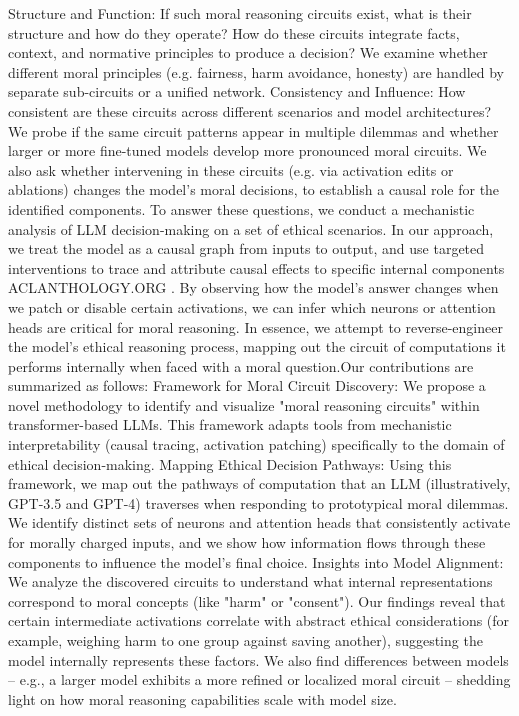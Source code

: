 Structure and Function: If such moral reasoning circuits exist, what is their structure and how do they operate? How do these circuits integrate facts, context, and normative principles to produce a decision? We examine whether different moral principles (e.g. fairness, harm avoidance, honesty) are handled by separate sub-circuits or a unified network.
Consistency and Influence: How consistent are these circuits across different scenarios and model architectures? We probe if the same circuit patterns appear in multiple dilemmas and whether larger or more fine-tuned models develop more pronounced moral circuits. We also ask whether intervening in these circuits (e.g. via activation edits or ablations) changes the model’s moral decisions, to establish a causal role for the identified components.
To answer these questions, we conduct a mechanistic analysis of LLM decision-making on a set of ethical scenarios. In our approach, we treat the model as a causal graph from inputs to output, and use targeted interventions to trace and attribute causal effects to specific internal components​
ACLANTHOLOGY.ORG
. By observing how the model’s answer changes when we patch or disable certain activations, we can infer which neurons or attention heads are critical for moral reasoning. In essence, we attempt to reverse-engineer the model’s ethical reasoning process, mapping out the circuit of computations it performs internally when faced with a moral question.Our contributions are summarized as follows:
Framework for Moral Circuit Discovery: We propose a novel methodology to identify and visualize "moral reasoning circuits" within transformer-based LLMs. This framework adapts tools from mechanistic interpretability (causal tracing, activation patching) specifically to the domain of ethical decision-making.
Mapping Ethical Decision Pathways: Using this framework, we map out the pathways of computation that an LLM (illustratively, GPT-3.5 and GPT-4) traverses when responding to prototypical moral dilemmas. We identify distinct sets of neurons and attention heads that consistently activate for morally charged inputs, and we show how information flows through these components to influence the model’s final choice.
Insights into Model Alignment: We analyze the discovered circuits to understand what internal representations correspond to moral concepts (like "harm" or "consent"). Our findings reveal that certain intermediate activations correlate with abstract ethical considerations (for example, weighing harm to one group against saving another), suggesting the model internally represents these factors. We also find differences between models – e.g., a larger model exhibits a more refined or localized moral circuit – shedding light on how moral reasoning capabilities scale with model size.
